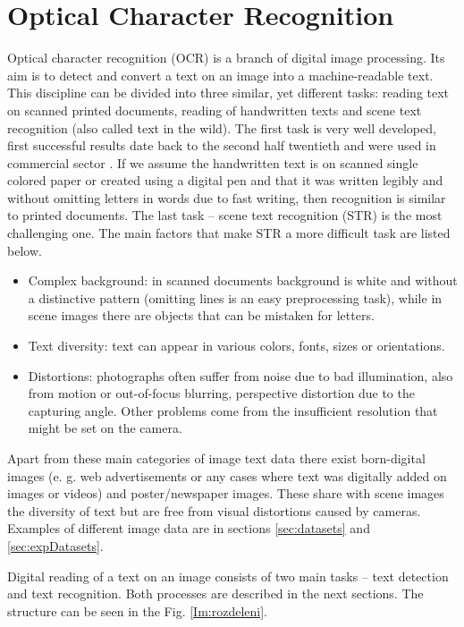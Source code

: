 \chapter{Optical Character Recognition}
\label{ch:OCR}

Optical character recognition (OCR) is a branch of digital image processing. Its aim is to detect and convert a text on an image into a machine-readable text. This discipline can be divided into three similar, yet different tasks: reading text on scanned printed documents, reading of handwritten texts and scene text recognition (also called text in the wild). The first task is very well developed, first successful results date back to the second half twentieth and were used in commercial sector \cite{ocrhist}. If we assume the handwritten text is on scanned single colored paper or created using a digital pen and that it was written legibly and without omitting letters in words due to fast writing, then recognition is similar to printed documents. The last task -- scene text recognition (STR) is the most challenging one. 
The main factors that make STR a more difficult task are listed below.\cite{chen2021text, raisi2020text}

\begin{itemize}
    \item Complex background: in scanned documents background is white and without  a distinctive pattern (omitting lines is an easy preprocessing task), while in scene images there are objects that can be mistaken for letters.
    \item Text diversity: text can appear in various colors, fonts, sizes or orientations.
    \item Distortions: photographs often suffer from noise due to bad illumination, also from motion or out-of-focus blurring, perspective distortion due to the capturing angle. Other problems come from the insufficient resolution that might be set on the camera.
\end{itemize}

Apart from these main categories of image text data there exist born-digital images (e. g. web advertisements or any cases where text was digitally added on images or videos) and poster/newspaper images. These share with scene images the diversity of text but are free from visual distortions caused by cameras. Examples of different image data are in sections \ref*{sec:datasets} and \ref*{sec:expDatasets}. 

Digital reading of a text on an image consists of two main tasks -- text detection and text recognition. Both processes are described in the next sections. The structure can be seen in the Fig. \ref{Im:rozdeleni}.

